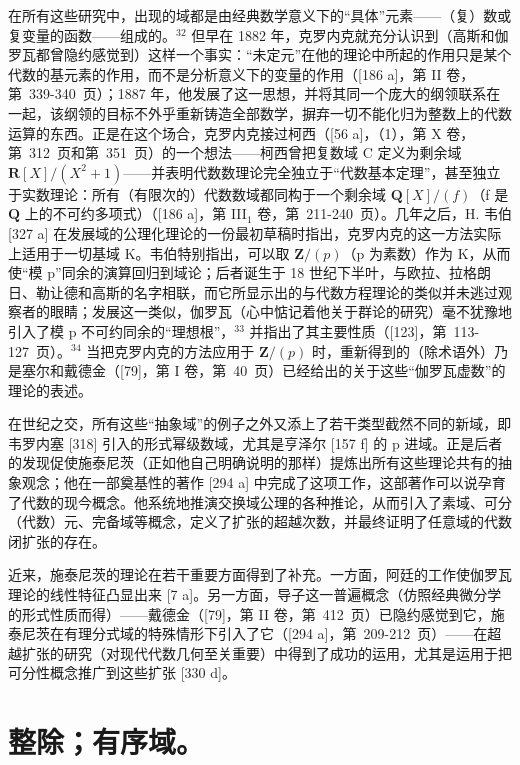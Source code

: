 在所有这些研究中，出现的域都是由经典数学意义下的“具体”元素——（复）数或复变量的函数——组成的。\(^{32}\) 但早在 1882 年，克罗内克就充分认识到（高斯和伽罗瓦都曾隐约感觉到）这样一个事实：“未定元”在他的理论中所起的作用只是某个代数的基元素的作用，而不是分析意义下的变量的作用（{[}186 a{]}，第 II 卷，第~339-340~页）；1887 年，他发展了这一思想，并将其同一个庞大的纲领联系在一起，该纲领的目标不外乎重新铸造全部数学，摒弃一切不能化归为整数上的代数运算的东西。正是在这个场合，克罗内克接过柯西（{[}56 a{]}，（1），第 X 卷，第~312~页和第~351~页）的一个想法——柯西曾把复数域 C 定义为剩余域 \(\mathbf{R}[X]/(X^{2}+1)\)——并表明代数数理论完全独立于“代数基本定理”，甚至独立于实数理论：所有（有限次的）代数数域都同构于一个剩余域 \(\mathbf{Q}[X]/(f)\)（f 是 \(\mathbf{Q}\) 上的不可约多项式）（{[}186 a{]}，第 III\(_{1}\) 卷，第~211-240~页）。几年之后，H. 韦伯 {[}327 a{]} 在发展域的公理化理论的一份最初草稿时指出，克罗内克的这一方法实际上适用于一切基域 K。韦伯特别指出，可以取 \(\mathbf{Z}/(p)\)（p 为素数）作为 K，从而使“模 p”同余的演算回归到域论；后者诞生于 18 世纪下半叶，与欧拉、拉格朗日、勒让德和高斯的名字相联，而它所显示出的与代数方程理论的类似并未逃过观察者的眼睛；发展这一类似，伽罗瓦（心中惦记着他关于群论的研究）毫不犹豫地引入了模 p 不可约同余的“理想根”，\(^{33}\) 并指出了其主要性质（{[}123{]}，第~113-127~页）。\(^{34}\) 当把克罗内克的方法应用于 \(\mathbf{Z}/(p)\) 时，重新得到的（除术语外）乃是塞尔和戴德金（{[}79{]}，第 I 卷，第~40~页）已经给出的关于这些“伽罗瓦虚数”的理论的表述。

在世纪之交，所有这些“抽象域”的例子之外又添上了若干类型截然不同的新域，即韦罗内塞 {[}318{]} 引入的形式幂级数域，尤其是亨泽尔 {[}157 f{]} 的 p 进域。正是后者的发现促使施泰尼茨（正如他自己明确说明的那样）提炼出所有这些理论共有的抽象观念；他在一部奠基性的著作 {[}294 a{]} 中完成了这项工作，这部著作可以说孕育了代数的现今概念。他系统地推演交换域公理的各种推论，从而引入了素域、可分（代数）元、完备域等概念，定义了扩张的超越次数，并最终证明了任意域的代数闭扩张的存在。

近来，施泰尼茨的理论在若干重要方面得到了补充。一方面，阿廷的工作使伽罗瓦理论的线性特征凸显出来 {[}7 a{]}。另一方面，导子这一普遍概念（仿照经典微分学的形式性质而得）——戴德金（{[}79{]}，第 II 卷，第~412~页）已隐约感觉到它，施泰尼茨在有理分式域的特殊情形下引入了它（{[}294 a{]}，第~209-212~页）——在超越扩张的研究（对现代代数几何至关重要）中得到了成功的运用，尤其是运用于把可分性概念推广到这些扩张 {[}330 d{]}。

\chapter{整除；有序域。}

